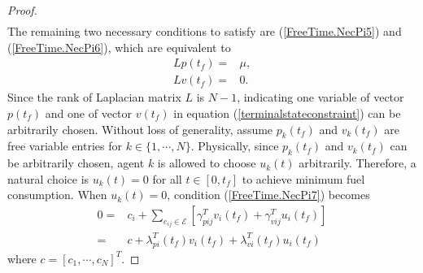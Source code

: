 \documentclass[12pt,draftcls,onecolumn]{IEEEtran}  %
\begin{document}
{\begin{proof}
\begin{align}
\end{align}
The remaining two necessary conditions to satisfy are (\ref{FreeTime.NecPi5}) and (\ref{FreeTime.NecPi6}), which are equivalent to
\begin{subequations}\label{terminalstateconstraint}
\begin{align}
Lp(t_f)=&\mu,\\
Lv(t_f)=&0.
\end{align}
\end{subequations}
Since the rank of Laplacian matrix $L$ is $N-1$, indicating one variable of vector $p(t_f)$ and one of vector $v(t_f)$ in equation (\ref{terminalstateconstraint}) can be arbitrarily chosen. Without loss of generality, assume $p_k(t_f)$ and $v_k(t_f)$ are free variable entries for $k\in\{1,\cdots,N\}$. Physically, since $p_k(t_f)$ and $v_k(t_f)$ can be arbitrarily chosen, agent $k$ is allowed to choose $u_k(t)$ arbitrarily. Therefore, a natural choice is $u_k(t)=0$ for all $t\in[0,t_f]$ to achieve minimum fuel consumption. When $u_k(t)=0$, condition (\ref{FreeTime.NecPi7}) becomes
\begin{align*}
0=&c_i+\sum_{e_{ij}\in\mathcal{E}} [\gamma^T_{pij} v_i(t_f)+\gamma^T_{vij} u_i(t_f)]\\
=&c+\lambda^T_{pi}(t_f) v_i(t_f)+\lambda^T_{vi}(t_f) u_i(t_f)
\end{align*}
where $c=[c_1,\cdots,c_N]^T$.


\end{proof}}
\end{document}
